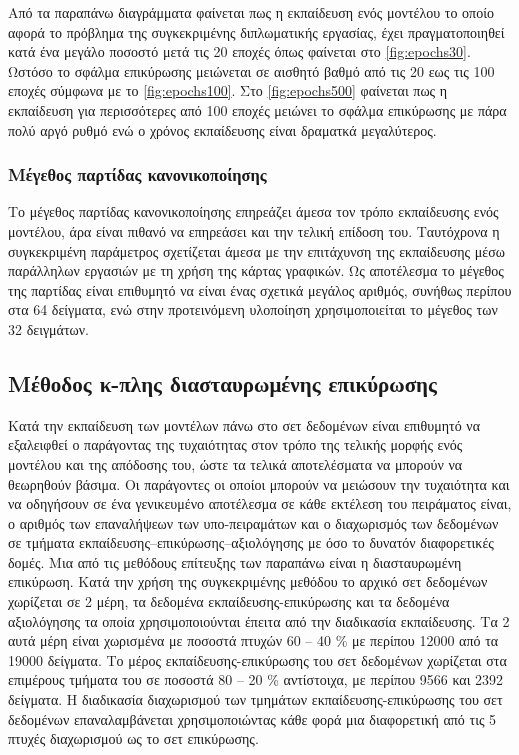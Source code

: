 Από τα παραπάνω διαγράμματα φαίνεται πως η εκπαίδευση ενός μοντέλου το οποίο αφορά το πρόβλημα της συγκεκριμένης διπλωματικής εργασίας, έχει πραγματοποιηθεί κατά ένα μεγάλο ποσοστό μετά τις 20 εποχές όπως φαίνεται στο \ref{fig:epochs30}. Ωστόσο το σφάλμα επικύρωσης μειώνεται σε αισθητό βαθμό από τις 20 εως τις 100 εποχές σύμφωνα με το \ref{fig:epochs100}. Στο \ref{fig:epochs500} φαίνεται πως η εκπαίδευση για περισσότερες από 100 εποχές μειώνει το σφάλμα επικύρωσης με πάρα πολύ αργό ρυθμό ενώ ο χρόνος εκπαίδευσης είναι δραματκά μεγαλύτερος.

\subsubsection{Μέγεθος παρτίδας κανονικοποίησης}
Το μέγεθος παρτίδας κανονικοποίησης επηρεάζει άμεσα τον τρόπο εκπαίδευσης ενός μοντέλου, άρα είναι πιθανό να επηρεάσει και την τελική επίδοση του. Ταυτόχρονα η συγκεκριμένη παράμετρος σχετίζεται άμεσα με την επιτάχυνση της εκπαίδευσης μέσω παράλληλων εργασιών με τη χρήση της κάρτας γραφικών. Ως αποτέλεσμα  το μέγεθος της παρτίδας είναι επιθυμητό να είναι ένας σχετικά μεγάλος αριθμός, συνήθως περίπου στα 64 δείγματα, ενώ στην προτεινόμενη υλοποίηση χρησιμοποιείται το μέγεθος των 32 δειγμάτων.

\subsection{Μέθοδος κ-πλης διασταυρωμένης επικύρωσης}
Κατά την εκπαίδευση των μοντέλων πάνω στο σετ δεδομένων είναι επιθυμητό να εξαλειφθεί ο παράγοντας της τυχαιότητας στον τρόπο της τελικής μορφής ενός μοντέλου και της απόδοσης του, ώστε τα τελικά αποτελέσματα να μπορούν να θεωρηθούν βάσιμα.
Οι παράγοντες οι οποίοι μπορούν να μειώσουν την τυχαιότητα και να οδηγήσουν σε ένα γενικευμένο αποτέλεσμα σε κάθε εκτέλεση του πειράματος είναι, ο αριθμός των επαναλήψεων των υπο-πειραμάτων και ο διαχωρισμός των δεδομένων σε τμήματα εκπαίδευσης--επικύρωσης--αξιολόγησης με όσο το δυνατόν διαφορετικές δομές.
Μια από τις μεθόδους επίτευξης των παραπάνω είναι η διασταυρωμένη επικύρωση. Κατά την χρήση της συγκεκριμένης μεθόδου το αρχικό σετ δεδομένων χωρίζεται σε 2 μέρη, τα δεδομένα εκπαίδευσης-επικύρωσης και τα δεδομένα αξιολόγησης τα οποία χρησιμοποιούνται έπειτα από την διαδικασία εκπαίδευσης. Τα 2 αυτά μέρη είναι χωρισμένα με ποσοστά πτυχών 60 -- 40 \% με περίπου 12000 από τα 19000 δείγματα. Το μέρος εκπαίδευσης-επικύρωσης του σετ δεδομένων χωρίζεται στα επιμέρους τμήματα του σε ποσοστά 80 -- 20 \% αντίστοιχα, με περίπου 9566 και 2392 δείγματα.
Η διαδικασία διαχωρισμού των τμημάτων εκπαίδευσης-επικύρωσης του σετ δεδομένων επαναλαμβάνεται χρησιμοποιώντας κάθε φορά μια διαφορετική από τις 5 πτυχές διαχωρισμού ως το σετ επικύρωσης.

